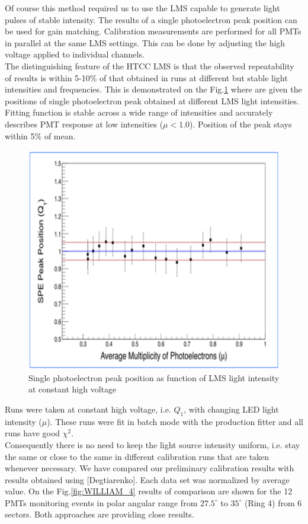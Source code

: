 Of course this method required us to use the LMS capable to generate light pulses of stable intensity. The results of a single photoelectron peak position can be used for gain matching. Calibration measurements are performed for all PMTs in parallel at the same LMS settings. This can be done by adjusting the high voltage applied to individual channels. \\
\indent The distinguishing feature of the HTCC LMS is that the observed repeatability of results is within 5-10\% of that obtained in runs at different but stable light intensities and frequencies. This is demonstrated on the Fig.\ref{fig:WILLIAM_5}
where are given the positions of single photoelectron peak obtained at different LMS light intensities. Fitting function is stable across a wide range of intensities and accurately describes PMT response at low intensities ($\mu<1.0$). Position of the peak stays within 5\% of mean.

\begin{figure}[h]
\centering
\includegraphics[width=0.99\linewidth]{images/WILLIAM_5.png}
\caption{Single photoelectron peak position as function of LMS light intensity at constant high voltage}
\label{fig:WILLIAM_5}
\end{figure}

Runs were taken at constant high voltage, i.e. $Q_{ 1}$, with changing LED light intensity ($\mu$). These runs were fit in batch mode with the production fitter and all runs have good $\chi{^2}$.\\ 
\indent Consequently there is no need to keep the light source intensity uniform, i.e. stay the same or close to the same in different calibration runs that are taken whenever necessary.
We have compared our preliminary calibration results with results obtained using [Degtiarenko]. Each data set was normalized by average value. On the Fig.\ref{fig:WILLIAM_4} results of comparison are shown for the 12 PMTs monitoring events in polar angular range from $27.5^\circ$ to $35^\circ$ (Ring 4) from 6 sectors. Both approaches are providing close results.

